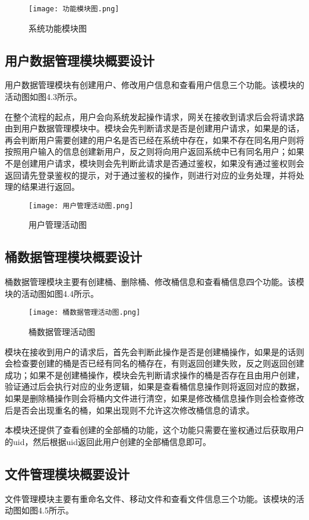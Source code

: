 \begin{figure}[h]
  \centering
  \texttt{[image: 功能模块图.png]}
  \caption{系统功能模块图}
\end{figure}

\subsection{用户数据管理模块概要设计}

用户数据管理模块有创建用户、修改用户信息和查看用户信息三个功能。该模块的活动图如图4.3所示。

在整个流程的起点，用户会向系统发起操作请求，网关在接收到请求后会将请求路由到用户数据管理模块中。模块会先判断请求是否是创建用户请求，如果是的话，再会判断用户需要创建的用户名是否已经在系统中存在，如果不存在同名用户则将按照用户输入的信息创建新用户，反之则将向用户返回系统中已有同名用户；如果不是创建用户请求，模块则会先判断此请求是否通过鉴权，如果没有通过鉴权则会返回请先登录鉴权的提示，对于通过鉴权的操作，则进行对应的业务处理，并将处理的结果进行返回。

\begin{figure}[h]
  \centering
  \texttt{[image: 用户管理活动图.png]}
  \caption{用户管理活动图}
\end{figure}

\subsection{桶数据管理模块概要设计}
桶数据管理模块主要有创建桶、删除桶、修改桶信息和查看桶信息四个功能。该模块的活动图如图4.4所示。

\begin{figure}[h]
  \centering
  \texttt{[image: 桶数据管理活动图.png]}
  \caption{桶数据管理活动图}
\end{figure}

模块在接收到用户的请求后，首先会判断此操作是否是创建桶操作，如果是的话则会检查要创建的桶是否已经有同名的桶存在，有则返回创建失败，反之则返回创建成功；如果不是创建桶操作，模块会先判断请求操作的桶是否存在且由用户创建，验证通过后会执行对应的业务逻辑，如果是查看桶信息操作则将返回对应的数据，如果是删除桶操作则会将桶内文件进行清空，如果是修改桶信息操作则会检查修改后是否会出现重名的桶，如果出现则不允许这次修改桶信息的请求。

本模块还提供了查看创建的全部桶的功能，这个功能只需要在鉴权通过后获取用户的uid，然后根据uid返回此用户创建的全部桶信息即可。
\subsection{文件管理模块概要设计}
文件管理模块主要有重命名文件、移动文件和查看文件信息三个功能。该模块的活动图如图4.5所示。

